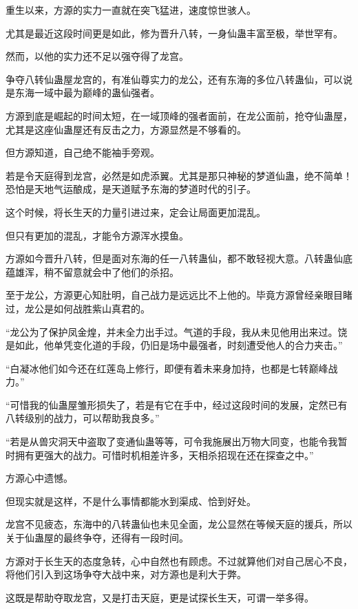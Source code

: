 
\begin{this_body}

重生以来，方源的实力一直就在突飞猛进，速度惊世骇人。

尤其是最近这段时间更是如此，修为晋升八转，一身仙蛊丰富至极，举世罕有。

然而，以他的实力还不足以强夺得了龙宫。

争夺八转仙蛊屋龙宫的，有准仙尊实力的龙公，还有东海的多位八转蛊仙，可以说是东海一域中最为巅峰的蛊仙强者。

方源到底是崛起的时间太短，在一域顶峰的强者面前，在龙公面前，抢夺仙蛊屋，尤其是这座仙蛊屋还有反击之力，方源显然是不够看的。

但方源知道，自己绝不能袖手旁观。

若是令天庭得到龙宫，必然是如虎添翼。尤其是那只神秘的梦道仙蛊，绝不简单！恐怕是天地气运酿成，是天道赋予东海的梦道时代的引子。

这个时候，将长生天的力量引进过来，定会让局面更加混乱。

但只有更加的混乱，才能令方源浑水摸鱼。

方源如今晋升八转，但是面对东海的任一八转蛊仙，都不敢轻视大意。八转蛊仙底蕴雄浑，稍不留意就会中了他们的杀招。

至于龙公，方源更心知肚明，自己战力是远远比不上他的。毕竟方源曾经亲眼目睹过，龙公是如何战胜紫山真君的。

“龙公为了保护凤金煌，并未全力出手过。气道的手段，我从未见他用出来过。饶是如此，他单凭变化道的手段，仍旧是场中最强者，时刻遭受他人的合力夹击。”

“白凝冰他们如今还在红莲岛上修行，即便有着未来身加持，也都是七转巅峰战力。”

“可惜我的仙蛊屋雏形损失了，若是有它在手中，经过这段时间的发展，定然已有八转级别的战力，可以帮助我良多。”

“若是从兽灾洞天中盗取了变通仙蛊等等，可令我施展出万物大同变，也能令我暂时拥有更强大的战力。可惜时机相差许多，天相杀招现在还在探查之中。”

方源心中遗憾。

但现实就是这样，不是什么事情都能水到渠成、恰到好处。

龙宫不见疲态，东海中的八转蛊仙也未见全面，龙公显然在等候天庭的援兵，所以关于仙蛊屋的最终争夺，还得有一段时间。

方源对于长生天的态度急转，心中自然也有顾虑。不过就算他们对自己居心不良，将他们引入到这场争夺大战中来，对方源也是利大于弊。

这既是帮助夺取龙宫，又是打击天庭，更是试探长生天，可谓一举多得。


\end{this_body}
